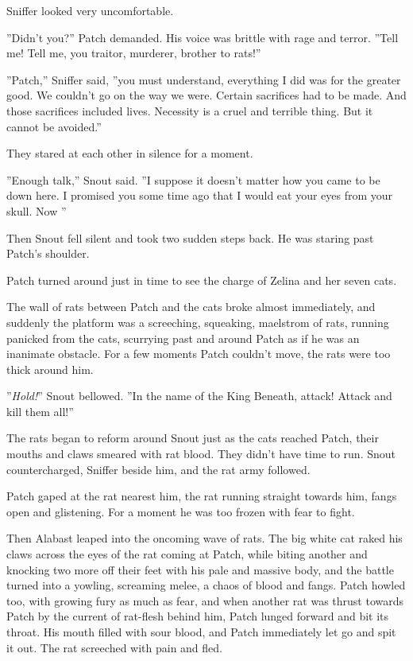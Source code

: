 \documentclass[11pt]{article}
\begin{document}
 Sniffer looked very uncomfortable.\par
 ''Didn't you?'' Patch demanded. His voice was brittle with rage and terror. ''Tell me! Tell me, you traitor, murderer, brother to rats!''\par
 ''Patch,'' Sniffer said, ''you must understand, everything I did was for the greater good. We couldn't go on the way we were. Certain sacrifices had to be made. And those sacrifices included lives. Necessity is a cruel and terrible thing. But it cannot be avoided.''\par
 They stared at each other in silence for a moment.\par
 ''Enough talk,'' Snout said. ''I suppose it doesn't matter how you came to be down here. I promised you some time ago that I would eat your eyes from your skull. Now %
''\par
 Then Snout fell silent and took two sudden steps back. He was staring past Patch's shoulder.\par
Patch turned around just in time to see the charge of Zelina and her seven cats.\par
The wall of rats between Patch and the cats broke almost immediately, and suddenly the platform was a screeching, squeaking, maelstrom of rats, running panicked from the cats, scurrying past and around Patch as if he was an inanimate obstacle. For a few moments Patch couldn't move, the rats were too thick around him.\par
 ''{\it Hold!}'' Snout bellowed. ''In the name of the King Beneath, attack! Attack and kill them all!''\par
 The rats began to reform around Snout just as the cats reached Patch, their mouths and claws smeared with rat blood. They didn't have time to run. Snout countercharged, Sniffer beside him, and the rat army followed.\par
Patch gaped at the rat nearest him, the rat running straight towards him, fangs open and glistening. For a moment he was too frozen with fear to fight.\par
 Then Alabast leaped into the oncoming wave of rats. The big white cat raked his claws across the eyes of the rat coming at Patch, while biting another and knocking two more off their feet with his pale and massive body, and the battle turned into a yowling, screaming melee, a chaos of blood and fangs. Patch howled too, with growing fury as much as fear, and when another rat was thrust towards Patch by the current of rat-flesh behind him, Patch lunged forward and bit its throat. His mouth filled with sour blood, and Patch immediately let go and spit it out. The rat screeched with pain and fled.\par
\end{document}
